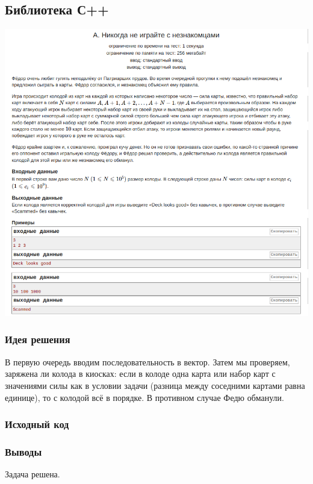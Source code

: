 \subsection*{Библиотека С++}
\begin{center}
\includegraphics[width=\textwidth]{statements/Contest2A.png}
\end{center}

\subsubsection*{Идея решения}

В первую очередь вводим последовательность в вектор. Затем мы проверяем, заряжена ли колода в киосках: если в колоде одна карта или набор карт с значениями силы как в условии задачи (разница между соседними картами равна единице), то с колодой всё в порядке. В противном случае Федю обманули.

\subsubsection*{Исходный код}


\subsubsection*{Выводы}
Задача решена.
\newline

